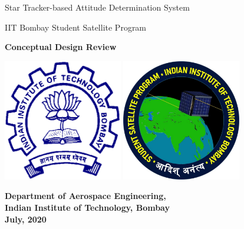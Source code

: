 \begin{titlepage}
\sffamily
\centering
\Large

{\huge 
\bfseries{Star Tracker-based Attitude Determination System

\vspace{40pt}

IIT Bombay Student Satellite Program}
}

\vspace{60pt}

{\LARGE \bfseries{Conceptual Design Review}}

\vspace{60pt}



\begin{center}
    \includegraphics[width=0.39\textwidth]{Figures/Foreword/iitb_logo.png}
    \hspace{15pt}
    \includegraphics[width=0.39\textwidth]{Figures/Foreword/iitb_ssp_logo.jpg}
\end{center} 



\vspace{60pt}
\bfseries{Department of Aerospace Engineering, \\ \bigskip Indian Institute of Technology, Bombay\\ \bigskip
July, 2020}
\end{titlepage}
